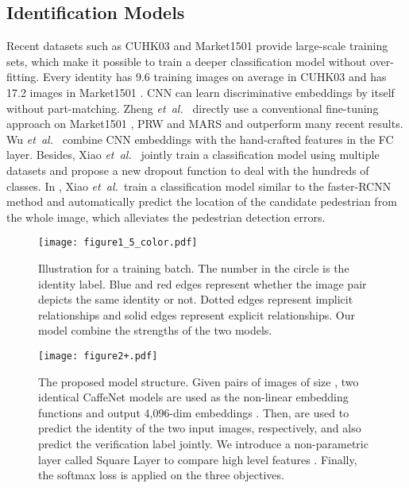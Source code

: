 \documentclass[journal]{IEEEtran}
\newcommand{\etal}{\mbox{\emph{et al.\ }}}
\begin{document}
\subsection{Identification Models}
Recent datasets such as CUHK03 \cite{li2014deepreid} and Market1501 \cite{zheng2015scalable} provide large-scale training sets, which make it possible to train a deeper classification model without over-fitting. Every identity has 9.6 training images on average in CUHK03 \cite{li2014deepreid} and has 17.2 images in Market1501 \cite{zheng2015scalable}. CNN can learn discriminative embeddings by itself without part-matching. Zheng \etal \cite{zheng2016survey,zheng2016person,zheng2016mars} directly use a conventional fine-tuning approach on Market1501 \cite{zheng2015scalable}, PRW \cite{zheng2016person} and MARS \cite{zheng2016mars} and outperform many recent results. 
Wu \etal \cite{wu2016enhanced} combine CNN embeddings with the hand-crafted features in the FC layer.
Besides, Xiao \etal \cite{xiao2016learning} jointly train a classification model using multiple datasets and propose a new dropout function to deal with the hundreds of classes. In \cite{xiao2016end}, Xiao \etal train a classification model similar to the faster-RCNN \cite{girshick2015fast} method and automatically predict the location of the candidate pedestrian from the whole image, which alleviates the pedestrian detection errors. 

\begin{figure}[t]
\begin{center}
\texttt{[image: figure1\_5\_color.pdf]}
\end{center}
   \caption{Illustration for a training batch. The number in the circle is the identity label. Blue and red edges represent whether the image pair depicts the same identity or not. Dotted edges represent implicit relationships and solid edges represent explicit relationships. Our model combine the strengths of the two models.}
\label{fig:3}
\label{fig:onecol}
\end{figure}

\begin{figure*}
\begin{center} 
\texttt{[image: figure2+.pdf]}
\end{center}
   \caption{The proposed model structure. Given  pairs of images of size , two identical CaffeNet models are used as the non-linear embedding functions and output 4,096-dim embeddings . Then,  are used to predict the identity  of the two input images, respectively, and also predict the verification label  jointly. We introduce a non-parametric layer called Square Layer to compare high level features . Finally, the softmax loss is applied on the three objectives.}
\label{fig:2}
\end{figure*}
\end{document}
